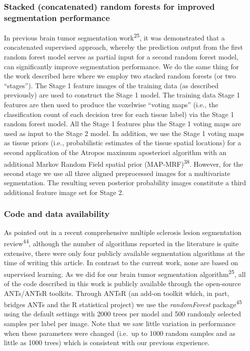 \documentclass[11pt,]{article}
\begin{document}
\subsubsection{Stacked (concatenated) random forests for improved
segmentation
performance}\label{stacked-concatenated-random-forests-for-improved-segmentation-performance}

In previous brain tumor segmentation work\textsuperscript{25}, it was
demonstrated that a concatenated supervised approach, whereby the
prediction output from the first random forest model serves as partial
input for a second random forest model, can significantly improve
segmentation performance. We do the same thing for the work described
here where we employ two stacked random forests (or two ``stages''). The
Stage 1 feature images of the training data (as described previously)
are used to construct the Stage 1 model. The training data Stage 1
features are then used to produce the voxelwise ``voting maps'' (i.e.,
the classification count of each decision tree for each tissue label)
via the Stage 1 random forest model. All the Stage 1 features plus the
Stage 1 voting maps are used as input to the Stage 2 model. In addition,
we use the Stage 1 voting maps as tissue priors (i.e., probabilistic
estimates of the tissue spatial locations) for a second application of
the Atropos maximum aposteriori algorithm with an additional Markov
Random Field spatial prior (MAP-MRF)\textsuperscript{38}. However, for
the second stage we use all three aligned preprocessed images for a
multivariate segmentation. The resulting seven posterior probability
images constitute a third additional feature image set for Stage 2.

\subsubsection{Code and data
availability}\label{code-and-data-availability}

As pointed out in a recent comprehensive multiple sclerosis lesion
segmentation review\textsuperscript{44}, although the number of
algorithms reported in the literature is quite extensive, there were
only four publicly available segmentation algorithms at the time of
writing this article. In contrast to the current work, none are based on
supervised learning. As we did for our brain tumor segmentation
algorithm\textsuperscript{25}, all of the code described in this work is
publicly available through the open-source ANTs/ANTsR toolkits. Through
ANTsR (an add-on toolkit which, in part, bridges ANTs and the R
statistical project) we use the \emph{randomForest}
package\textsuperscript{45} using the default settings with 2000 trees
per model and 500 randomly selected samples per label per image. Note
that we saw little variation in performance when these parameters were
changed (i.e.~up to 1000 random samples and as little as 1000 trees)
which is consistent with our previous experience.
\end{document}
